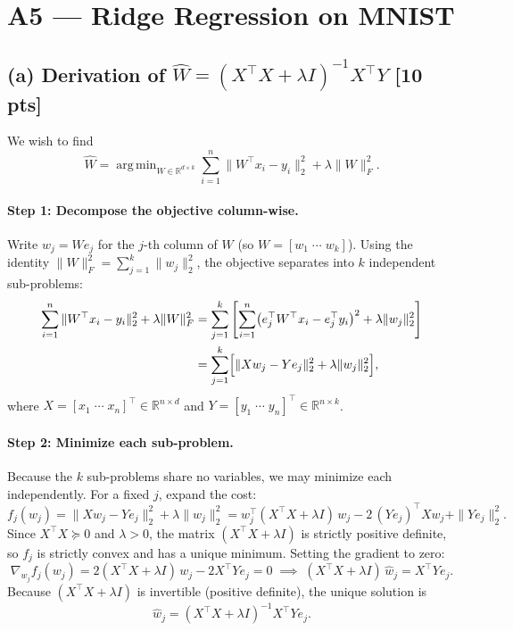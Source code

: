 \documentclass{article}
\DeclareMathOperator*{\argmin}{arg\,min}
\begin{document}
\clearpage
\section*{A5 --- Ridge Regression on MNIST}

\subsection*{(a) Derivation of $\hat{W} = (X^\top X + \lambda I)^{-1} X^\top Y$ \hfill [10 pts]}

We wish to find
\[
  \hat{W} = \argmin_{W \in \mathbb{R}^{d \times k}}
  \sum_{i=1}^{n} \bigl\|W^\top x_i - y_i\bigr\|_2^2
  + \lambda \|W\|_F^2.
\]

\paragraph{Step 1: Decompose the objective column-wise.}
Write $w_j = W e_j$ for the $j$-th column of $W$ (so $W = [w_1 \; \cdots \; w_k]$).
Using the identity $\|W\|_F^2 = \sum_{j=1}^k \|w_j\|_2^2$, the objective separates into
$k$ independent sub-problems:
\begin{align*}
  \sum_{i=1}^n \|W^\top x_i - y_i\|_2^2 + \lambda\|W\|_F^2
  &= \sum_{j=1}^{k}
     \left[
       \sum_{i=1}^n \bigl(e_j^\top W^\top x_i - e_j^\top y_i\bigr)^2
       + \lambda\|w_j\|_2^2
     \right] \\
  &= \sum_{j=1}^{k}
     \Bigl[
       \|Xw_j - Ye_j\|_2^2 + \lambda\|w_j\|_2^2
     \Bigr],
\end{align*}
where $X = [x_1 \;\cdots\; x_n]^\top \in \mathbb{R}^{n \times d}$ and
$Y = [y_1 \;\cdots\; y_n]^\top \in \mathbb{R}^{n \times k}$.

\paragraph{Step 2: Minimize each sub-problem.}
Because the $k$ sub-problems share no variables, we may minimize each independently.
For a fixed $j$, expand the cost:
\[
  f_j(w_j)
  = \|Xw_j - Ye_j\|_2^2 + \lambda\|w_j\|_2^2
  = w_j^\top (X^\top X + \lambda I)\, w_j
    - 2\,(Ye_j)^\top X w_j
    + \|Ye_j\|_2^2.
\]
Since $X^\top X \succeq 0$ and $\lambda > 0$, the matrix $(X^\top X + \lambda I)$ is
strictly positive definite, so $f_j$ is strictly convex and has a unique minimum.
Setting the gradient to zero:
\[
  \nabla_{w_j} f_j(w_j)
  = 2(X^\top X + \lambda I)\,w_j - 2 X^\top Y e_j = 0
  \;\implies\;
  (X^\top X + \lambda I)\,\hat{w}_j = X^\top Y e_j.
\]
Because $(X^\top X + \lambda I)$ is invertible (positive definite), the unique solution is
\[
  \hat{w}_j = (X^\top X + \lambda I)^{-1} X^\top Y e_j.
\]
\end{document}
